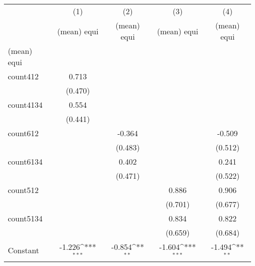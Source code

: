 {
\def\sym#1{\ifmmode^{#1}\else\(^{#1}\)\fi}
\begin{tabular}{l*{4}{c}}
\hline\hline
                    &\multicolumn{1}{c}{(1)}&\multicolumn{1}{c}{(2)}&\multicolumn{1}{c}{(3)}&\multicolumn{1}{c}{(4)}\\
                    &\multicolumn{1}{c}{(mean) equi}&\multicolumn{1}{c}{(mean) equi}&\multicolumn{1}{c}{(mean) equi}&\multicolumn{1}{c}{(mean) equi}\\
\hline
(mean) equi         &                     &                     &                     &                     \\
count412            &       0.713         &                     &                     &                     \\
                    &     (0.470)         &                     &                     &                     \\
[1em]
count4134           &       0.554         &                     &                     &                     \\
                    &     (0.441)         &                     &                     &                     \\
[1em]
count612            &                     &      -0.364         &                     &      -0.509         \\
                    &                     &     (0.483)         &                     &     (0.512)         \\
[1em]
count6134           &                     &       0.402         &                     &       0.241         \\
                    &                     &     (0.471)         &                     &     (0.522)         \\
[1em]
count512            &                     &                     &       0.886         &       0.906         \\
                    &                     &                     &     (0.701)         &     (0.677)         \\
[1em]
count5134           &                     &                     &       0.834         &       0.822         \\
                    &                     &                     &     (0.659)         &     (0.684)         \\
[1em]
Constant            &      -1.226\sym{***}&      -0.854\sym{**} &      -1.604\sym{***}&      -1.494\sym{**} \\

\end{tabular}}
